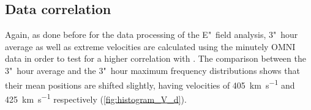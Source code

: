 \subsection{Data correlation}
Again, as done before for the data processing of the E"~field analysis, 3"~hour average as well as extreme velocities are calculated using the minutely OMNI data in order to test for a higher correlation with \Kp{}. The comparison between the 3"~hour average and the 3"~hour maximum frequency distributions shows that their mean positions are shifted slightly, having velocities of \SI{405}{\km\per\s} and \SI{425}{\km\per\s} respectively (\autoref{fig:histogram_V_d}).
\begin{figure}[htb]
	\begin{floatrow}
\end{floatrow}
\end{figure}

